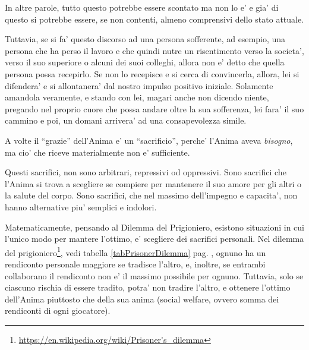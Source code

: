In altre parole, tutto questo potrebbe essere scontato ma non lo e' e gia' di questo si potrebbe essere, se non contenti, almeno comprensivi dello stato attuale.

Tuttavia, se si fa' questo discorso ad una persona sofferente, ad esempio, una persona che ha perso il lavoro e che quindi nutre un risentimento verso la societa', verso il suo superiore o alcuni dei suoi colleghi, allora non e' detto che quella persona possa recepirlo. Se non lo recepisce e si cerca di convincerla, allora, lei si difendera' e si allontanera' dal nostro impulso positivo iniziale. Solamente amandola veramente, e stando con lei, magari anche non dicendo niente, pregando nel proprio cuore che possa andare oltre la sua sofferenza, lei fara' il suo cammino e poi, un domani arrivera' ad una consapevolezza simile.

A volte il ``grazie'' dell'Anima e' un ``sacrificio'', perche' l'Anima aveva \emph{bisogno}, ma cio' che riceve materialmente non e' sufficiente.

Questi sacrifici, non sono arbitrari, repressivi od oppressivi. Sono sacrifici che l'Anima si trova a scegliere se compiere per mantenere il suo amore per gli altri o la salute del corpo. Sono sacrifici, che nel massimo dell'impegno e capacita', non hanno alternative piu' semplici e indolori.

Matematicamente, pensando al Dilemma del Prigioniero, esistono situazioni in cui l'unico modo per mantere l'ottimo, e' scegliere dei sacrifici personali. Nel dilemma del prigioniero\footnote{\url{https://en.wikipedia.org/wiki/Prisoner's\_dilemma}}, vedi tabella \ref{tabPrisonerDilemma} pag. \pageref{tabPrisonerDilemma}, ognuno ha un rendiconto personale maggiore se tradisce l'altro, e, inoltre, se entrambi collaborano il rendiconto non e' il massimo possibile per ognuno. Tuttavia, solo se ciascuno rischia di essere tradito, potra' non tradire l'altro, e ottenere l'ottimo dell'Anima piuttosto che della sua anima (social welfare, ovvero somma dei rendiconti di ogni giocatore).

